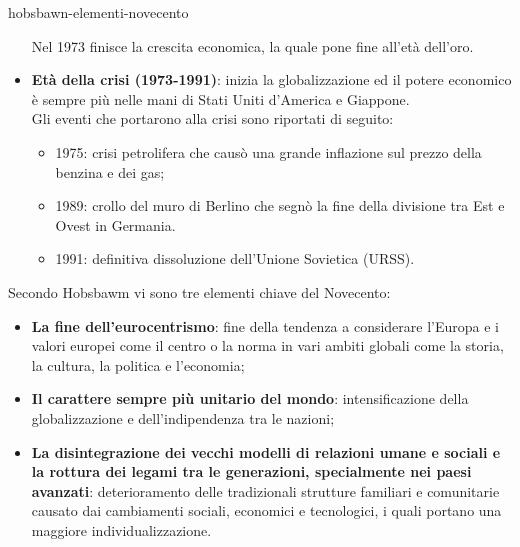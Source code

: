 \documentclass[preview]{standalone}
\begin{document}
\begin{snippet}{hobsbawn-elementi-novecento}
\begin{itemize}
            Nel 1973 finisce la crescita economica, la quale pone fine all'età dell'oro.
        \item \textbf{Età della crisi (1973-1991)}: inizia la globalizzazione ed il potere economico
            è sempre più nelle mani di Stati Uniti d'America e Giappone.\\
            Gli eventi che portarono alla crisi sono riportati di seguito:
            \begin{itemize}
                \item 1975: crisi petrolifera che causò una grande inflazione sul prezzo della benzina e dei gas;
                \item 1989: crollo del muro di Berlino che segnò la fine della divisione tra
                    Est e Ovest in Germania.
                \item 1991: definitiva dissoluzione dell'Unione Sovietica (URSS).
            \end{itemize}
    \end{itemize}
    Secondo Hobsbawm vi sono tre elementi chiave del Novecento:
    \begin{itemize}
        \item \textbf{La fine dell'eurocentrismo}:
            fine della tendenza a considerare l'Europa e i valori europei come il centro o la norma
            in vari ambiti globali come la storia, la cultura, la politica e l'economia;
        \item \textbf{Il carattere sempre più unitario del mondo}:
            intensificazione della globalizzazione e dell'indipendenza tra le nazioni;
        \item \textbf{La disintegrazione dei vecchi modelli di relazioni umane e sociali e la rottura
            dei legami tra le generazioni, specialmente nei paesi avanzati}:
            deterioramento delle tradizionali strutture familiari e comunitarie causato dai 
            cambiamenti sociali, economici e tecnologici, i quali portano una maggiore individualizzazione.
    \end{itemize}
\end{snippet}
\end{document}
